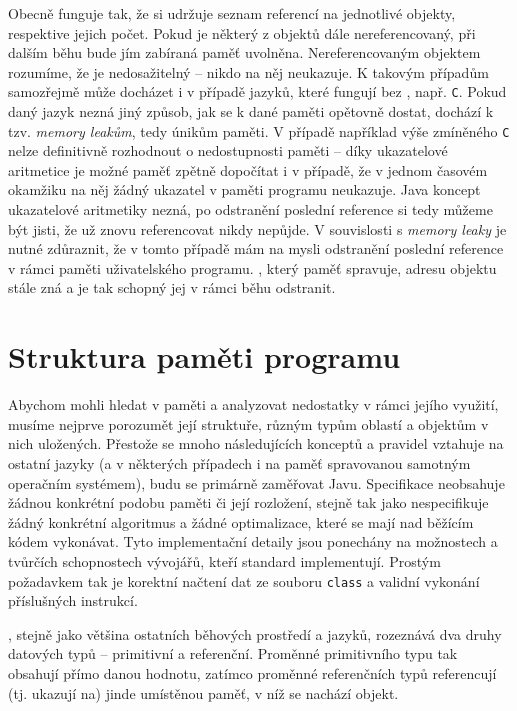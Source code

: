 Obecně  funguje tak, že si udržuje seznam referencí na jednotlivé objekty, respektive jejich počet. Pokud je některý z objektů dále nereferencovaný, při dalším běhu  bude jím zabíraná paměť uvolněna. Nereferencovaným objektem rozumíme, že je nedosažitelný -- nikdo na něj neukazuje. K takovým případům samozřejmě může docházet i v případě jazyků, které fungují bez , např. \texttt{C}. Pokud daný jazyk nezná jiný způsob, jak se k dané paměti opětovně dostat, dochází k tzv. \textit{memory leakům}, tedy únikům paměti. V případě například výše zmíněného \texttt{C} nelze definitivně rozhodnout o nedostupnosti paměti -- díky ukazatelové aritmetice je možné paměť zpětně dopočítat i v případě, že v jednom časovém okamžiku na něj žádný ukazatel v paměti programu neukazuje. Java koncept ukazatelové aritmetiky nezná, po odstranění poslední reference si tedy můžeme být jisti, že už znovu referencovat nikdy nepůjde. V souvislosti s \textit{memory leaky} je nutné zdůraznit, že v tomto případě mám na mysli odstranění poslední reference v rámci paměti uživatelského programu. , který paměť spravuje, adresu objektu stále zná a je tak schopný jej v rámci běhu  odstranit.



\chapter{Struktura paměti programu}

Abychom mohli hledat v paměti a analyzovat nedostatky v rámci jejího využití, musíme nejprve porozumět její struktuře, různým typům oblastí a objektům v nich uložených. Přestože se mnoho následujících konceptů a pravidel vztahuje na ostatní jazyky (a v některých případech i na paměť spravovanou samotným operačním systémem), budu se primárně zaměřovat Javu. Specifikace  neobsahuje žádnou konkrétní podobu paměti či její rozložení, stejně tak jako nespecifikuje žádný konkrétní algoritmus  a žádné optimalizace, které se mají nad běžícím kódem vykonávat. Tyto implementační detaily jsou ponechány na možnostech a tvůrčích schopnostech vývojářů, kteří standard implementují. Prostým požadavkem tak je korektní načtení dat ze souboru \texttt{class} a validní vykonání příslušných instrukcí.

, stejně jako většina ostatních běhových prostředí a jazyků, rozeznává dva druhy datových typů -- primitivní a referenční. Proměnné primitivního typu tak obsahují přímo danou hodnotu, zatímco proměnné referenčních typů referencují (tj. ukazují na) jinde umístěnou paměť, v níž se nachází objekt.


